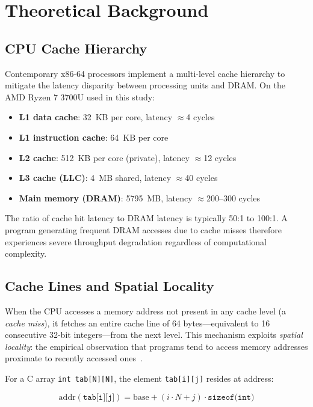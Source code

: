 \documentclass[conference]{IEEEtran}
\begin{document}
\section{Theoretical Background}
\label{sec:bg}

\subsection{CPU Cache Hierarchy}

Contemporary x86-64 processors implement a multi-level cache hierarchy to
mitigate the latency disparity between processing units and DRAM. On the AMD
Ryzen 7 3700U used in this study:

\begin{itemize}
  \item \textbf{L1 data cache}: 32~KB per core, latency $\approx$4 cycles
  \item \textbf{L1 instruction cache}: 64~KB per core
  \item \textbf{L2 cache}: 512~KB per core (private), latency $\approx$12 cycles
  \item \textbf{L3 cache (LLC)}: 4~MB shared, latency $\approx$40 cycles
  \item \textbf{Main memory (DRAM)}: 5795~MB, latency $\approx$200--300 cycles
\end{itemize}

The ratio of cache hit latency to DRAM latency is typically 50:1 to 100:1.
A program generating frequent DRAM accesses due to cache misses therefore
experiences severe throughput degradation regardless of computational complexity.

\subsection{Cache Lines and Spatial Locality}

When the CPU accesses a memory address not present in any cache level (a
\textit{cache miss}), it fetches an entire cache line of 64 bytes---equivalent
to 16 consecutive 32-bit integers---from the next level. This mechanism
exploits \textit{spatial locality}: the empirical observation that programs
tend to access memory addresses proximate to recently accessed
ones~\cite{denning2005}.

For a C array \texttt{int tab[N][N]}, the element \texttt{tab[i][j]} resides
at address:

\begin{equation}
  \text{addr}(\texttt{tab[i][j]}) = \text{base} + (i \cdot N + j) \cdot
  \texttt{sizeof(int)}
  \label{eq:addr}
\end{equation}
\end{document}
